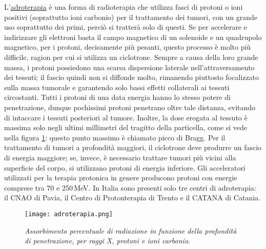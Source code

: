 \documentclass{report}
\newcommand{\figref}[1]{figura \ref{#1}}
\numberwithin{equation}{section}
\numberwithin{figure}{section}
\begin{document}
L'\underline{adroterapia} è una forma di radioterapia che utilizza fasci di protoni o ioni positivi (soprattutto ioni carbonio) per il trattamento dei tumori, con un grande uso soprattutto dei primi, perciò si tratterà solo di questi. Se per accelerare e indirizzare gli elettroni basta il campo magnetico di un solenoide e un quadrupolo magnetico, per i protoni, decisamente più pesanti, questo processo è molto più difficile, ragion per cui si utilizza un ciclotrone. Sempre a causa della loro grande massa, i protoni possiedono una scarsa dispersione laterale nell'attraversamento dei tessuti; il fascio quindi non si diffonde molto, rimanendo piuttosto focalizzato sulla massa tumorale e garantendo solo bassi effetti collaterali ai tessuti circostanti. Tutti i protoni di una data energia hanno lo stesso potere di penetrazione, dunque pochissimi protoni penetrano oltre tale distanza, evitando di intaccare i tessuti posteriori al tumore. Inoltre, la dose erogata al tessuto è massima solo negli ultimi millimetri del tragitto della particella, come si vede nella \figref{fig:adroterapia}: questo punto massimo è chiamato picco di Bragg. Per il trattamento di tumori a profondità maggiori, il ciclotrone deve produrre un fascio di energia maggiore; se, invece, è necessario trattare tumori più vicini alla superficie del corpo, si utilizzano protoni di energia inferiore. Gli acceleratori utilizzati per la terapia protonica in genere producono protoni con energie comprese tra 70 e 250\,MeV. In Italia sono presenti solo tre centri di adroterapia: il CNAO di Pavia, il Centro di Protonterapia di Trento e il CATANA di Catania.

\begin{figure}[htp]
\centering
\texttt{[image: adroterapia.png]}
\caption{\label{fig:adroterapia} \textit{Assorbimento percentuale di radiazione in funzione della profondità di penetrazione, per raggi X, protoni e ioni carbonio}.}
\end{figure}
\end{document}
